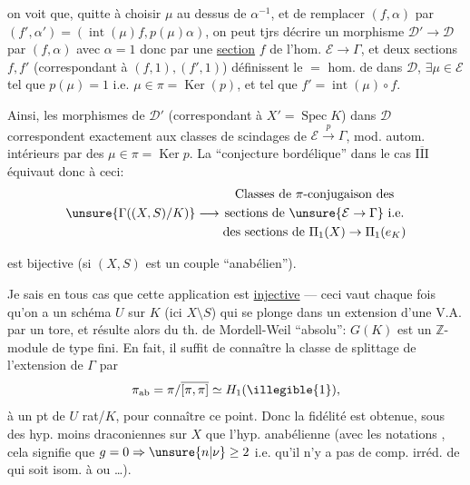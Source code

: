 

on voit que, quitte à choisir $\mu$ au dessus de  $\alpha^{-1}$, et de remplacer $(f,\alpha)$ par $(f',\alpha')=(\operatorname{int}(\mu)f,p(\mu)\alpha)$, on peut tjrs décrire un morphisme $\mathcal D'\to\mathcal D$ par $(f,\alpha)$ avec $\alpha=1$ donc par une \uline{section} $f$ de l'hom. $\mathcal E\to\Gamma$, et deux sections $f,f'$ (correspondant à $(f,1),(f',1)$) définissent le $=$ hom. de  dans $\mathcal D$,  $\exists\mu\in\mathcal E$ tel que $p(\mu)=1$ i.e. $\mu\in\pi=\operatorname{Ker}(p)$, et tel que $f'=\operatorname{int}(\mu)\circ f$.

Ainsi, les morphismes de $\mathcal D'$ (correspondant à $X'=\operatorname{Spec}K$) dans $\mathcal D$ correspondent exactement aux classes de scindages de $\mathcal E\xrightarrow{p}\Gamma$, mod. autom. intérieurs par des $\mu\in\pi=\operatorname{Ker}p$. La ``conjecture bordélique'' dans le cas \uline{$\overline{\mathrm{III}}$} équivaut donc à ceci:
\[
 \unsure{\Gamma((X,S)/K)}\longrightarrow
 \begin{gathered}
 \text{Classes de $\pi$-conjugaison des}\\
 \text{sections de }\unsure{\mathcal E\to\Gamma}\text{ i.e.}\\
 \text{des sections de }\Pi_1(X)\to\Pi_1(e_K)
 \end{gathered}
\]



est bijective (si $(X,S)$ est un couple ``anabélien'').

Je sais en tous cas que cette application est \uline{injective} --- ceci vaut chaque fois qu'on a un schéma $U$ sur $K$ (ici $X\setminus S$) qui se plonge dans un  extension d'une V.A. par un tore, et résulte alors du th. de Mordell-Weil ``absolu'': $G(K)$ est un $\mathbb Z$-module de type fini.
En fait, il suffit de connaître la classe de splittage de l'extension  de $\Gamma$ par
\[
 \pi_{\mathrm{ab}}=\pi/\overline{[\pi,\pi]}\simeq H_1(\illegible{1}),
\]
  à un pt de $U$ rat/$K$, pour connaître ce point. Donc la  fidélité est obtenue, sous des hyp. moins draconiennes sur $X$ que l'hyp. anabélienne (avec les notations  , cela signifie que $g=0\Rightarrow\unsure{n|\nu}\ge2$ i.e. qu'il n'y a pas de comp. irréd. de  qui soit isom. à  ou  \ldots).

